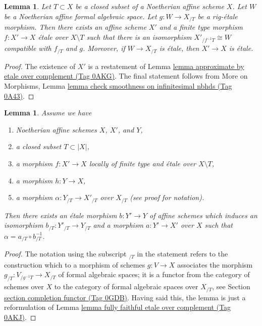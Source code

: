 \documentclass{amsart}
\theoremstyle{plain}
\newtheorem{lemma}[subsection]{Lemma}
\theoremstyle{definition}
\theoremstyle{remark}
\numberwithin{equation}{subsection}
\begin{document}
\begin{lemma}
\label{lemma-algebraize-rig-etale-affine}
Let $T \subset X$ be a closed subset of a Noetherian affine scheme $X$.
Let $W$ be a Noetherian affine formal algebraic space.
Let $g : W \to X_{/T}$ be a rig-\'etale morphism. Then there exists
an affine scheme $X'$ and a finite type morphism $f : X' \to X$
\'etale over $X \setminus T$ such that there is an isomorphism
$X'_{/f^{-1}T} \cong W$ compatible with $f_{/T}$ and $g$.
Moreover, if $W \to X_{/T}$ is \'etale, then $X' \to X$ is \'etale.
\end{lemma}

\begin{proof}
The existence of $X'$ is a restatement of
Lemma \href{https://stacks.math.columbia.edu/tag/0AKG}{lemma approximate by etale over complement (Tag 0AKG)}.
The final statement follows from
More on Morphisms, Lemma
\href{https://stacks.math.columbia.edu/tag/0A43}{lemma check smoothness on infinitesimal nbhds (Tag 0A43)}.
\end{proof}


\begin{lemma}
\label{lemma-algebraize-morphism-rig-etale}
Assume we have
\begin{enumerate}
\item Noetherian affine schemes $X$, $X'$, and $Y$,
\item a closed subset $T \subset |X|$,
\item a morphism $f : X' \to X$ locally of finite type
and \'etale over $X \setminus T$,
\item a morphism $h : Y \to X$,
\item a morphism $\alpha : Y_{/T} \to X'_{/T}$ over $X_{/T}$
(see proof for notation).
\end{enumerate}
Then there exists an \'etale morphism $b : Y' \to Y$ of affine schemes
which induces an isomorphism $b_{/T} : Y'_{/T} \to Y_{/T}$
and a morphism $a : Y' \to X'$ over $X$
such that $\alpha = a_{/T} \circ b_{/T}^{-1}$.
\end{lemma}

\begin{proof}
The notation using the subscript ${}_{/T}$ in the statement
refers to the construction which to a morphism of schemes $g : V \to X$
associates the morphism $g_{/T} : V_{/g^{-1}T} \to X_{/T}$ of formal
algebraic spaces; it is a functor from the category of schemes over $X$
to the category of formal algebraic spaces over $X_{/T}$, see
Section \href{https://stacks.math.columbia.edu/tag/0GDB}{section completion functor (Tag 0GDB)}.
Having said this, the lemma is just a reformulation of
Lemma \href{https://stacks.math.columbia.edu/tag/0AKJ}{lemma fully faithful etale over complement (Tag 0AKJ)}.
\end{proof}
\end{document}
